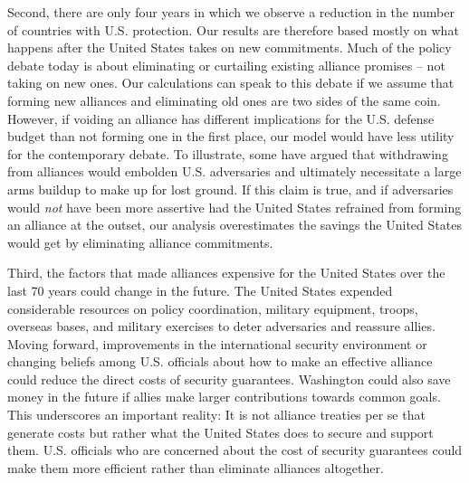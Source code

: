 Second, there are only four years in which we observe a reduction in the number of countries with U.S. protection. Our results are therefore based mostly on what happens after the United States takes on new commitments. Much of the policy debate today is about eliminating or curtailing existing alliance promises -- not taking on new ones. Our calculations can speak to this debate if we assume that forming new alliances and eliminating old ones are two sides of the same coin. However, if voiding an alliance has different implications for the U.S. defense budget than not forming one in the first place, our model would have less utility for the contemporary debate. To illustrate, some have argued that withdrawing from alliances would embolden U.S. adversaries and ultimately necessitate a large arms buildup to make up for lost ground.\autocite{colbyTNI16} If this claim is true, and if adversaries would \textit{not} have been more assertive had the United States refrained from forming an alliance at the outset, our analysis overestimates the savings the United States would get by eliminating alliance commitments.

Third, the factors that made alliances expensive for the United States over the last 70 years could change in the future. The United States expended considerable resources on policy coordination, military equipment, troops, overseas bases, and military exercises to deter adversaries and reassure allies. %
Moving forward, improvements in the international security environment or changing beliefs among U.S. officials about how to make an effective alliance could reduce the direct costs of security guarantees. Washington could also save money in the future if allies make larger contributions towards common goals. This underscores an important reality: It is not alliance treaties per se that generate costs but rather what the United States does to secure and support them.\autocite[84-85]{rapphoopershields20} U.S. officials who are concerned about the cost of security guarantees could make them more efficient rather than eliminate alliances altogether.


